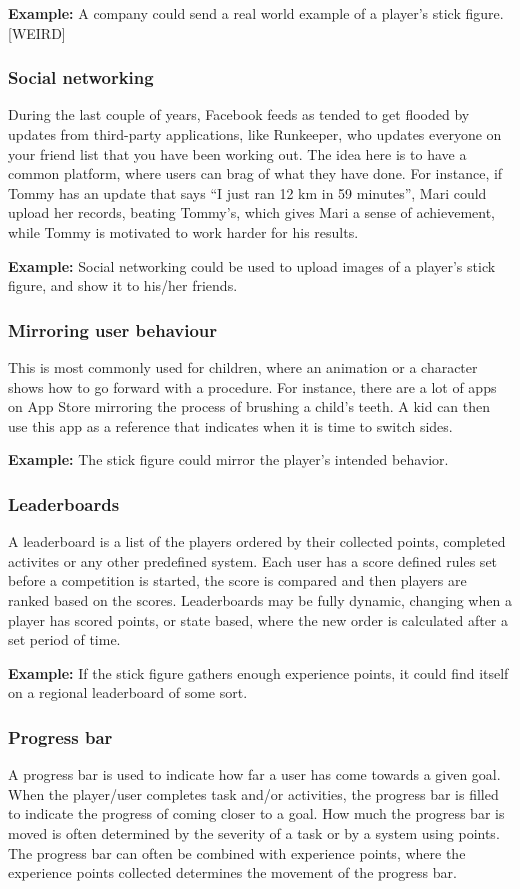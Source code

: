 \textbf{Example:} A company could send a real world example of a player's stick figure. [WEIRD]

\subsubsection{Social networking}
During the last couple of years, Facebook feeds as tended to get flooded by updates from third-party applications, like Runkeeper, who updates everyone on your friend list that you have been working out. The idea here is to have a common platform, where users can brag of what they have done. For instance, if Tommy has an update that says ``I just ran 12 km in 59 minutes'', Mari could upload her records, beating Tommy's, which gives Mari a sense of achievement, while Tommy is motivated to work harder for his results.     

\textbf{Example:} Social networking could be used to upload images of a player's stick figure, and show it to his/her friends. 

\subsubsection{Mirroring user behaviour}
This is most commonly used for children, where an animation or a character shows how to go forward with a procedure. For instance, there are a lot of apps on App Store mirroring the process of brushing a child's teeth. A kid can then use this app as a reference that indicates when it is time to switch sides.  

\textbf{Example:} The stick figure could mirror the player's intended behavior. 

\subsubsection{Leaderboards}
A leaderboard is a list of the players ordered by their collected points, completed activites or any other predefined system. Each user has a score defined rules set before a competition is started, the score is compared and then players are ranked based on the scores. Leaderboards may be fully dynamic, changing when a player has scored points, or state based, where the new order is calculated after a set period of time.

\textbf{Example:} If the stick figure gathers enough experience points, it could find itself on a regional leaderboard of some sort. 

\subsubsection{Progress bar}
A progress bar is used to indicate how far a user has come towards a given goal. When the player/user completes task and/or activities, the progress bar is filled to indicate the progress of coming closer to a goal. How much the progress bar is moved is often determined by the severity of a task or by a system using points. The progress bar can often be combined with experience points, where the experience points collected determines the movement of the progress bar. 

